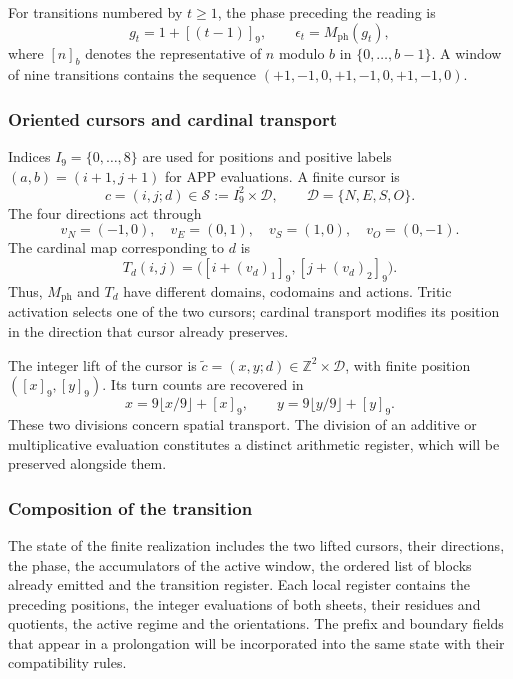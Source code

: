 For transitions numbered by \(t\geq1\), the phase preceding the reading is
\begin{equation}
 g_t=1+[(t-1)]_9,\qquad \epsilon_t=M_{\mathrm{ph}}(g_t),
 \label{tpk:fase}
\end{equation}
where \([n]_b\) denotes the representative of \(n\) modulo \(b\) in
\(\{0,\ldots,b-1\}\). A window of nine transitions contains the sequence
\((+1,-1,0,+1,-1,0,+1,-1,0)\).

\subsubsection{Oriented cursors and cardinal transport}

Indices \(I_9=\{0,\ldots,8\}\) are used for positions and positive
labels \((a,b)=(i+1,j+1)\) for APP evaluations. A finite cursor is
\[
 c=(i,j;d)\in\mathcal S:=I_9^2\times\mathcal D,
 \qquad \mathcal D=\{N,E,S,O\}.
\]
The four directions act through
\[
 v_N=(-1,0),\quad v_E=(0,1),\quad
 v_S=(1,0),\quad v_O=(0,-1).
\]
The cardinal map corresponding to \(d\) is
\[
 T_d(i,j)=\bigl([i+(v_d)_1]_9,[j+(v_d)_2]_9\bigr).
\]
Thus, \(M_{\mathrm{ph}}\) and \(T_d\) have different domains, codomains and
actions. Tritic activation selects one of the two cursors;
cardinal transport modifies its position in the direction that cursor
already preserves.

The integer lift of the cursor is
\(\widetilde c=(x,y;d)\in\mathbb Z^2\times\mathcal D\), with finite position
\(([x]_9,[y]_9)\). Its turn counts are recovered in
\begin{equation}
 x=9\lfloor x/9\rfloor+[x]_9,\qquad
 y=9\lfloor y/9\rfloor+[y]_9.
 \label{tpk:vueltas}
\end{equation}
These two divisions concern spatial transport. The division of an
additive or multiplicative evaluation constitutes a distinct arithmetic
register, which will be preserved alongside them.

\subsubsection{Composition of the transition}

The state of the finite realization includes the two lifted cursors,
their directions, the phase, the accumulators of the active window, the ordered
list of blocks already emitted and the transition register. Each local
register contains the preceding positions, the integer evaluations of both
sheets, their residues and quotients, the active regime and the orientations.
The prefix and boundary fields that appear in a prolongation will be
incorporated into the same state with their compatibility rules.

